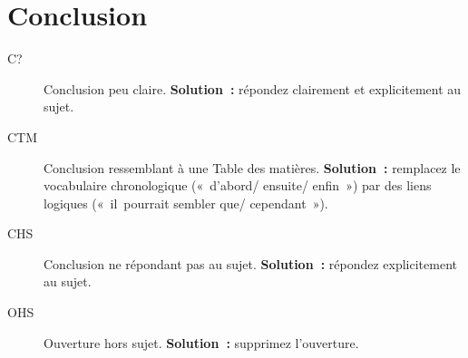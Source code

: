 \documentclass[a4paper,11pt]{article}
\begin{document}
\section{Conclusion}
\label{sec:orge2b9d3d}
\begin{description}
\item[{C\string?}] Conclusion peu claire. \textbf{Solution :} répondez clairement
et explicitement au sujet.
\item[{CTM}] Conclusion ressemblant à une Table des matières. \textbf{Solution :}
remplacez le vocabulaire chronologique (« d'abord/ ensuite/
enfin ») par des liens logiques (« il pourrait sembler que/
cependant »).
\item[{CHS}] Conclusion ne répondant pas au sujet. \textbf{Solution :} répondez
explicitement au sujet.
\item[{OHS}] Ouverture hors sujet. \textbf{Solution :} supprimez l'ouverture.
\end{description}
\end{document}
